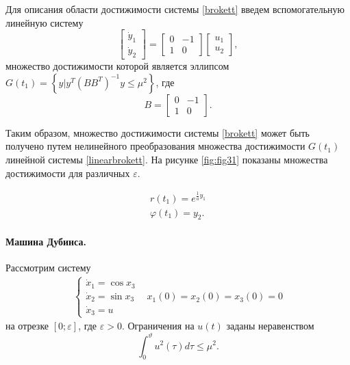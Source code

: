 \documentclass[../main.tex]{subfiles}
\begin{document}
 
 
 
 Для описания области достижимости системы \eqref{brokett} введем вспомогательную линейную систему
 \begin{equation}\label{linearbrokett}
	 \left[ {\begin{array}{*{20}{c}}
			 {{{\dot y}_1}}\\
			 {{{\dot y}_2}}
	 \end{array}} \right] = \left[ {\begin{array}{*{20}{c}}
			 0&{ - 1}\\
			 1&0
	 \end{array}} \right]\left[ {\begin{array}{*{20}{c}}
			 {{u_1}}\\
			 {{u_2}}
	 \end{array}} \right],
 \end{equation}
 множество достижимости которой является эллипсом $ G(t_1) = \left\lbrace y | y^T \left( B B^T\right)  ^{-1} y \leq \mu^2 \right\rbrace  $, где 
 \begin{equation*}
	 B = \left[ {\begin{array}{*{20}{c}}
			 0&{ - 1}\\
			 1&0
	 \end{array}} \right].
 \end{equation*}
 
 Таким образом, множество достижимости системы \eqref{brokett} может быть получено путем нелинейного преобразования множества достижимости $ G(t_1) $ линейной системы \eqref{linearbrokett}. На рисунке  \ref{fig:fig31} показаны множества достижимости для различных $ \varepsilon $.
 
 
 \begin{equation*}
	 \begin{array}{l}
		 r({t_1}) = {e^{ \frac{1}{a} y_1}}\\
		 \varphi ({t_1}) =  y_2. 
	 \end{array}
 \end{equation*}
 \paragraph{Машина Дубинса.} 
 Рассмотрим систему 
 \begin{equation}\label{system6}
	 \begin{array}{*{20}{c}}
		 {\left\{ {\begin{array}{*{20}{l}}
					 {{{\dot x}_1} = \cos {x_3}}\\
					 {{{\dot x}_2} = \sin {x_3}}\\
					 {{{\dot x}_3} = u}
			 \end{array}} \right.}&{{x_1}\left( 0 \right) = {x_2}\left( 0 \right) = {x_3}\left( 0 \right) = 0}
	 \end{array}
 \end{equation}
 на отрезке $ \left[0;\varepsilon \right] $, где $ \varepsilon > 0 $. Ограничения на $ u\left(t \right) $ заданы неравенством 
 \begin{equation}\label{constraints*}
	 \int_{0}^{\vartheta} u^2(\tau) d\tau \leqslant \mu^2.
 \end{equation}
 
\end{document}
